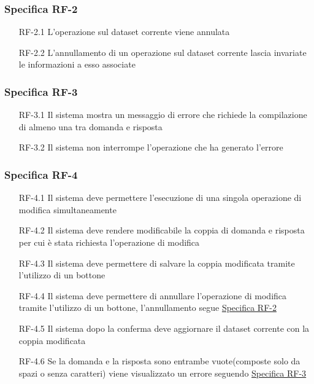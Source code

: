 \subsubsection{Specifica RF-2}
\label{subsubsec:RF-2}
\begin{enumerate}
    \item[RF-2.1] L'operazione sul dataset corrente viene annulata
    \item[RF-2.2] L'annullamento di un operazione sul dataset corrente lascia invariate le informazioni a esso associate 
\end{enumerate}

\subsubsection{Specifica RF-3}
\label{subsubsec:RF-3}
\begin{enumerate}
    \item[RF-3.1] Il sistema mostra un messaggio di errore che richiede la compilazione di almeno una tra domanda e risposta
    \item[RF-3.2] Il sistema non interrompe l'operazione che ha generato l'errore 
\end{enumerate}

\subsubsection{Specifica RF-4}
\label{subsubsec:RF-4}
\begin{enumerate}
    \item[RF-4.1] Il sistema deve permettere l'esecuzione di una singola operazione di modifica simultaneamente
    \item[RF-4.2] Il sistema deve rendere modificabile la coppia di domanda e risposta per cui è stata richiesta l'operazione di modifica
    \item[RF-4.3] Il sistema deve permettere di salvare la coppia modificata tramite l'utilizzo di un bottone
    \item[RF-4.4] Il sistema deve permettere di annullare l'operazione di modifica tramite l'utilizzo di un bottone, l'annullamento segue \hyperref[subsubsec:RF-2]{Specifica RF-2}
    \item[RF-4.5] Il sistema dopo la conferma deve aggiornare il dataset corrente con la coppia modificata
    \item[RF-4.6] Se la domanda e la risposta sono entrambe vuote(composte solo da spazi o senza caratteri) viene visualizzato un errore seguendo \hyperref[subsubsec:RF-3]{Specifica RF-3}
\end{enumerate}

